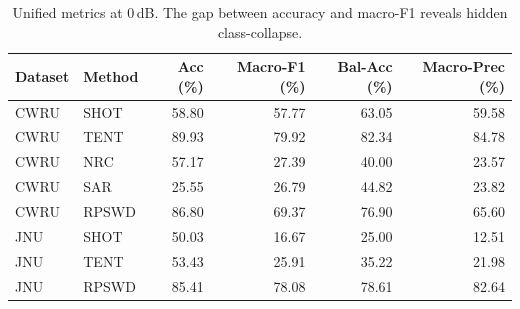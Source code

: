 \begin{table}[!t]
\centering
\footnotesize
\caption{Unified metrics at 0\,dB. The gap between accuracy and macro-F1 reveals hidden class-collapse.}
\label{tab:unified}
\begin{tabular}{llrrrr}
\toprule
Dataset & Method & Acc (\%) & Macro-F1 (\%) & Bal-Acc (\%) & Macro-Prec (\%) \\
\midrule
CWRU & SHOT & 58.80 & 57.77 & 63.05 & 59.58 \\
CWRU & TENT & 89.93 & 79.92 & 82.34 & 84.78 \\
CWRU & NRC & 57.17 & 27.39 & 40.00 & 23.57 \\
CWRU & SAR & 25.55 & 26.79 & 44.82 & 23.82 \\
CWRU & RPSWD & 86.80 & 69.37 & 76.90 & 65.60 \\
JNU & SHOT & 50.03 & 16.67 & 25.00 & 12.51 \\
JNU & TENT & 53.43 & 25.91 & 35.22 & 21.98 \\
JNU & RPSWD & 85.41 & 78.08 & 78.61 & 82.64 \\
\bottomrule
\end{tabular}
\end{table}
